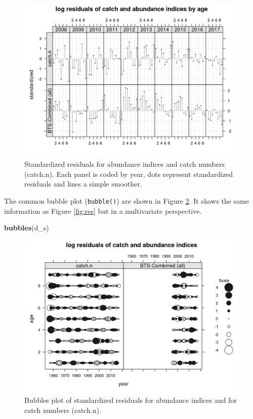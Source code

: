 \documentclass[
]{book}
\newenvironment{Shaded}{\begin{snugshade}}{\end{snugshade}}
\newcommand{\FunctionTok}[1]{\textcolor[rgb]{0.13,0.29,0.53}{\textbf{#1}}}
\newcommand{\NormalTok}[1]{#1}
\begin{document}
\begin{figure}
\centering
\includegraphics{_bookdown_files/_main_files/figure-html/resy-1.png}
\caption{\label{fig:resy}Standardized residuals for abundance indices and catch numbers (catch.n). Each panel is coded by year, dots represent standardized residuals and lines a simple smoother.}
\end{figure}

The common bubble plot (\texttt{bubble()}) are shown in Figure \ref{fig:bub}. It shows the same information as Figure \ref{fig:res} but in a multivariate perspective.

\begin{Shaded}
\begin{Highlighting}[]
\FunctionTok{bubbles}\NormalTok{(d\_s)}
\end{Highlighting}
\end{Shaded}

\begin{figure}
\centering
\includegraphics{_bookdown_files/_main_files/figure-html/bub-1.png}
\caption{\label{fig:bub}Bubbles plot of standardized residuals for abundance indices and for catch numbers (catch.n).}
\end{figure}
\end{document}
